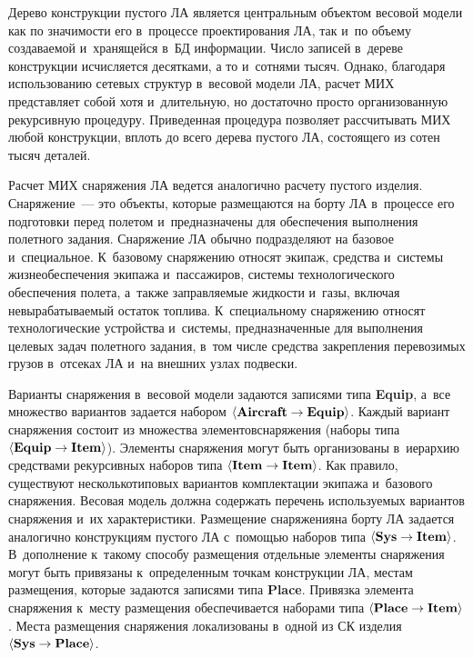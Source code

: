 \begin{multicols}{2}
\begin{figure*}
\vspace*{-4pt}                                                              
 
\end{figure*}

  Дерево конструкции пустого ЛА является центральным объектом весовой 
модели как по значимости его в~процессе проектирования ЛА, так и~по объему 
создаваемой и~хранящейся в~БД информации. Число записей в~дереве 
конструкции исчисляется десятками, а то и~сотнями тысяч. Однако, благодаря 
использованию сетевых структур в~весовой модели ЛА, расчет МИХ 
представляет собой хотя и~длительную, но достаточно просто организованную 
рекурсивную процедуру. Приведенная процедура позволяет рассчитывать МИХ 
любой конструкции, вплоть до всего дерева пустого ЛА, состоящего из сотен 
тысяч деталей.
  
  Расчет МИХ снаряжения ЛА ведется аналогично расчету пус\-то\-го изделия. 
Снаряжение~--- это объекты, которые размещаются на борту ЛА в~процессе его 
подготовки перед полетом и~предназначены для обеспечения выполнения 
полетного задания. Снаряжение ЛА обычно подразделяют на базовое 
и~специальное. К~базовому снаряжению относят экипаж, средства и~системы 
жизнеобеспечения экипажа и~пассажиров, системы технологического 
обеспечения полета, а~также заправляемые жидкости и~газы, включая 
невырабатываемый остаток топлива. К~специальному снаряжению относят 
технологические устройства и~системы, предназначенные для выполнения 
целевых задач полетного задания, в~том числе средства закрепления 
перевозимых грузов в~отсеках ЛА и~на внешних узлах подвески. 
  
  Варианты снаряжения в~весовой модели задаются записями типа 
\textbf{Equip}, а~все множество вариантов задается набором 
$\langle \mbox{\textbf{Aircraft}} \hm \to \mbox{\textbf{Equip}}\rangle$. 
Каждый вариант снаряжения состоит из множества элементов\linebreak снаряжения 
(наборы типа 
$\langle \mbox{\textbf{Equip}} \hm \to \mbox{\textbf{Item}}\rangle$). 
Элементы снаряжения могут быть организованы в~иерархию средствами 
рекурсивных наборов типа 
$\langle \mbox{\textbf{Item}}\hm \to \mbox{\textbf{Item}}\rangle$. Как 
правило, существуют несколько\linebreak типовых вариантов комплектации экипажа 
и~базового снаряжения. Весовая модель должна содержать перечень 
используемых вариантов снаряжения и~их характеристики. Размещение 
снаряжения\linebreak на борту ЛА задается аналогично конструкциям пус\-то\-го ЛА 
с~помощью наборов типа 
$\langle \mbox{\textbf{Sys}}\hm \to \mbox{\textbf{Item}}\rangle$. 
В~дополнение к~такому способу размещения отдельные элементы снаряжения 
могут быть привязаны к~определенным точкам конструкции ЛА, мес\-там 
размещения, которые задаются записями типа \textbf{Place}. Привязка 
элемента снаряжения к~мес\-ту размещения обеспечивается наборами типа 
$\langle \mbox{\textbf{Place}}\hm \to \mbox{\textbf{Item}}\rangle$. Мес\-та 
размещения снаряжения локализованы в~одной из СК изделия 
$\langle \mbox{\textbf{Sys}}\hm \to \mbox{\textbf{Place}}\rangle$.
  

\end{multicols}
